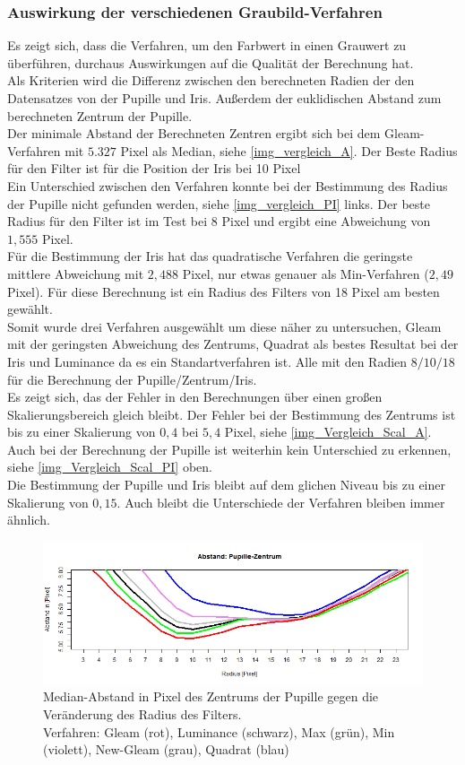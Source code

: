 \subsubsection{Auswirkung der verschiedenen Graubild-Verfahren}
Es zeigt sich, dass die Verfahren, um den Farbwert in einen Grauwert zu überführen, durchaus Auswirkungen auf die Qualität der Berechnung hat.\\
Als Kriterien wird die Differenz zwischen den berechneten Radien der den Datensatzes von der Pupille und Iris. Außerdem der euklidischen Abstand zum berechneten Zentrum der Pupille.\\
Der minimale Abstand der Berechneten Zentren ergibt sich bei dem Gleam-Verfahren mit $5.327$ Pixel als Median, siehe \autoref{img_vergleich_A}. Der Beste Radius für den Filter ist für die Position der Iris bei 10 Pixel\\
Ein Unterschied zwischen den Verfahren konnte bei der Bestimmung des Radius der Pupille nicht gefunden werden, siehe \autoref{img_vergleich_PI} links. Der beste Radius für den Filter ist im Test bei 8 Pixel und ergibt eine Abweichung von $1,555$ Pixel.\\
Für die Bestimmung der Iris hat das quadratische Verfahren die geringste mittlere Abweichung mit $2,488$ Pixel, nur etwas genauer als Min-Verfahren ($2,49$ Pixel). Für diese Berechnung ist ein Radius des Filters von 18 Pixel am besten gewählt.\\
Somit wurde drei Verfahren ausgewählt um diese näher zu untersuchen, Gleam mit der geringsten Abweichung des Zentrums, Quadrat als bestes Resultat bei der Iris und Luminance da es ein Standartverfahren ist. Alle mit den Radien $8/10/18$ für die Berechnung der Pupille/Zentrum/Iris.\\
Es zeigt sich, das der Fehler in den Berechnungen über einen großen Skalierungsbereich gleich bleibt. Der Fehler bei der Bestimmung des Zentrums ist bis zu einer Skalierung von $0,4$ bei $5,4$ Pixel, siehe \autoref{img_Vergleich_Scal_A}.\\
Auch bei der Berechnung der Pupille ist weiterhin kein Unterschied zu erkennen, siehe \autoref{img_Vergleich_Scal_PI} oben.\\
Die Bestimmung der Pupille und Iris bleibt auf dem glichen Niveau bis zu einer Skalierung von $0,15$. Auch bleibt die Unterschiede der Verfahren bleiben immer ähnlich.
\begin{figure}
	\centering
	\includegraphics[width=\linewidth]{Eye_Img_Box/Vergleich_A}
	\caption{Median-Abstand in Pixel des Zentrums der Pupille gegen die Veränderung des Radius des Filters.\\
	Verfahren: Gleam (rot), Luminance (schwarz), Max (grün), Min (violett), New-Gleam (grau), Quadrat (blau)}
	\label{img_vergleich_A}
\end{figure}
